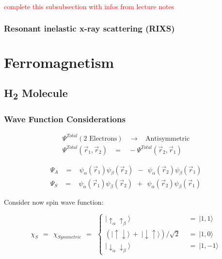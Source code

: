 \documentclass[10pt]{report}
\numberwithin{equation}{chapter}
\begin{document}
\textcolor{red}{complete this subsubsection with infos from lecture notes}


\subsubsection{Resonant inelastic x-ray scattering (RIXS)}



\section{Ferromagnetism}

\subsection{H\textsubscript{2} Molecule}

\subsubsection{Wave Function Considerations}

\begin{align}
  \Psi^{Total}(\text{2 Electrons})   ~~~~ \rightarrow ~~~~ \text{Antisymmetric}\\
  \Psi^{Total}(\vec{r}_1, \vec{r}_2) ~~~~ = ~~~~ - \Psi^{Total}(\vec{r}_2, \vec{r}_1)
\end{align}


\begin{align}
  \Psi_A ~~~~ = ~~~~ \psi_\alpha(\vec{r}_1) \psi_\beta(\vec{r}_2) ~~ - ~~ \psi_\alpha(\vec{r}_2)\psi_\beta(\vec{r}_1)\\
  \Psi_S ~~~~ = ~~~~ \psi_\alpha(\vec{r}_1) \psi_\beta(\vec{r}_2) ~~ + ~~ \psi_\alpha(\vec{r}_2)\psi_\beta(\vec{r}_1)
\end{align}



Consider now spin wave function:

\begin{equation}
  \chi_S ~~ = ~~ \chi_{Symmetric} ~~ = ~~ \left\{ 
  \begin{array}{ll}
    | \uparrow_\alpha \uparrow_\beta \rangle &~~=~ | 1,1 \rangle\\
    \left( | \uparrow \downarrow \rangle ~+~ | \downarrow \uparrow \rangle \right)/ \sqrt{2} &~~=~ | 1,0 \rangle\\
    | \downarrow_\alpha \downarrow_\beta \rangle &~~=~ | 1,-1 \rangle
  \end{array}\right.
\end{equation}
\end{document}
